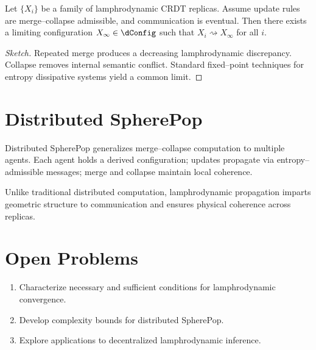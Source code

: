 \begin{theorem}
\label{thm:eventual-consistency}
Let $\{X_i\}$ be a family of lamphrodynamic CRDT replicas. Assume update
rules are merge--collapse admissible, and communication is eventual.
Then there exists a limiting configuration $X_\infty\in\dConfig$ such
that $X_i \rightsquigarrow X_\infty$ for all $i$.
\end{theorem}

\begin{proof}[Sketch]
Repeated merge produces a decreasing lamphrodynamic discrepancy. Collapse
removes internal semantic conflict. Standard fixed--point techniques for
entropy dissipative systems yield a common limit.
\end{proof}


\section{Distributed SpherePop}

Distributed SpherePop generalizes merge--collapse computation to multiple
agents. Each agent holds a derived configuration; updates propagate via
entropy--admissible messages; merge and collapse maintain local
coherence.

\begin{remark}
Unlike traditional distributed computation, lamphrodynamic propagation
imparts geometric structure to communication and ensures physical
coherence across replicas.
\end{remark}


\section{Open Problems}

\begin{enumerate}
\item Characterize necessary and sufficient conditions for
lamphrodynamic convergence.
\item Develop complexity bounds for distributed SpherePop.
\item Explore applications to decentralized lamphrodynamic inference.
\end{enumerate}

\newpage
